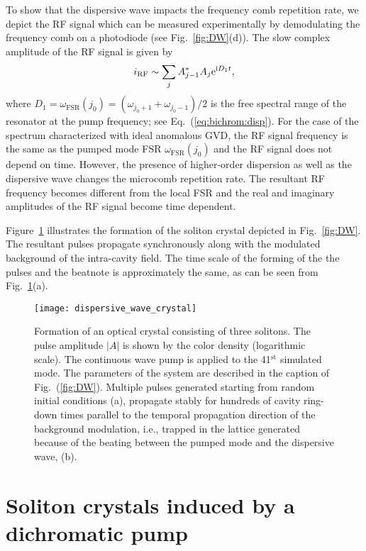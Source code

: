 To show that the dispersive wave impacts the frequency comb repetition rate, we depict the RF signal which can be measured experimentally by demodulating the frequency comb on a photodiode (see Fig.~\ref{fig:DW}(d)). The slow complex amplitude of the RF signal is given by
%
\begin{equation}
i_{\mathrm{RF}} \sim \sum_j A_{j-1}^*A_j \mathrm{e}^{\mathrm{i} D_1 t},
\end{equation}
%
where $D_1 = \omega_{\mathrm{FSR}}(j_0) = (\omega_{j_0+1}+\omega_{j_0-1})/2$ is the free spectral range of the resonator at the pump frequency; see Eq.~(\ref{eq:bichrom:disp}). For the case of the spectrum characterized with ideal anomalous GVD, the RF signal frequency is the same as the pumped mode FSR $\omega_{\mathrm{FSR}}(j_0)$ and the RF signal does not depend on time. However, the presence of higher-order dispersion as well as the dispersive wave changes the microcomb repetition rate. The resultant RF frequency becomes different from the local FSR and the real and imaginary amplitudes of the RF signal become time dependent.

Figure~\ref{fig:DWXtal} illustrates the formation of the soliton crystal depicted in Fig.~\ref{fig:DW}. The resultant pulses propagate synchronously along with the modulated background of the intra-cavity field. The time scale of the forming of the the pulses and the beatnote is approximately the same, as can be seen from Fig.~\ref{fig:DWXtal}(a).

%
\begin{figure}[th]
  \centering
  \texttt{[image: dispersive\_wave\_crystal]}
\caption{ \small Formation of an optical crystal consisting of three solitons. The pulse amplitude $|A|$ is shown by the color density (logarithmic scale). The continuous wave pump is applied to the 41$^{\mathrm{st}}$ simulated mode. The parameters of the system are described in the caption of Fig.~(\ref{fig:DW}). Multiple pulses generated starting from random initial conditions (a), propagate stably for hundreds of cavity ring-down times parallel to the temporal propagation direction of the background modulation, i.e., trapped in the lattice generated because of the beating between the pumped mode and the dispersive wave, (b).
} \label{fig:DWXtal}
\end{figure}
%


\section{Soliton crystals induced by a dichromatic pump}
\label{sec:Xtal_dichrom}

